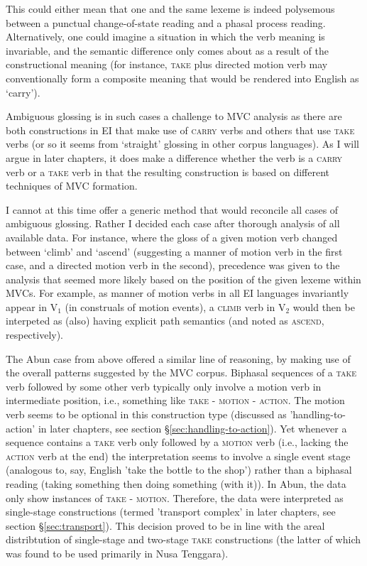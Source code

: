 This could either mean that one and the same lexeme is indeed polysemous between a punctual change-of-state reading and a phasal process reading. Alternatively, one could imagine a situation in which the verb meaning is invariable, and the semantic difference only comes about as a result of the constructional meaning (for instance, \textsc{take} plus directed motion verb may conventionally form a composite meaning that would be rendered into English as `carry'). 

Ambiguous glossing is in such cases a challenge to MVC analysis as there are both constructions in EI that make use of \textsc{carry} verbs and others that use \textsc{take} verbs (or so it seems from `straight' glossing in other corpus languages). As I will argue in later chapters, it does make a difference whether the verb is a \textsc{carry} verb or a \textsc{take} verb in that the resulting construction is based on different techniques of MVC formation. 

I cannot at this time offer a generic method that would reconcile all cases of ambiguous glossing. Rather I decided each case after thorough analysis of all available data. For instance, where the gloss of a given motion verb changed between `climb' and `ascend' (suggesting a manner of motion verb in the first case, and a directed motion verb in the second), precedence was given to the analysis that seemed more likely based on the position of the given lexeme within MVCs. For example, as manner of motion verbs in all EI languages invariantly appear in V$_1$ (in construals of motion events), a \textsc{climb} verb in V$_2$ would then be interpeted as (also) having explicit path semantics (and noted as \textsc{ascend}, respectively). 

The Abun case from above offered a similar line of reasoning, by making use of the overall patterns suggested by the MVC corpus. Biphasal sequences of a \textsc{take} verb followed by some other verb typically only involve a motion verb in intermediate position, i.e., something like \textsc{take} - \textsc{motion} - \textsc{action}. The motion verb seems to be optional in this construction type (discussed as 'handling-to-action' in later chapters, see section §\ref{sec:handling-to-action}). Yet whenever a sequence contains a \textsc{take} verb only followed by a \textsc{motion} verb (i.e., lacking the \textsc{action} verb at the end) the interpretation seems to involve a single event stage (analogous to, say, English 'take the bottle to the shop') rather than a biphasal reading (taking something then doing something (with it)). In Abun, the data only show instances of \textsc{take} - \textsc{motion}. Therefore, the data were interpreted as single-stage constructions (termed 'transport complex' in later chapters, see section §\ref{sec:transport}). This decision proved to be in line with the areal distribtution of single-stage and two-stage \textsc{take} constructions (the latter of which was found to be used primarily in Nusa Tenggara). 

